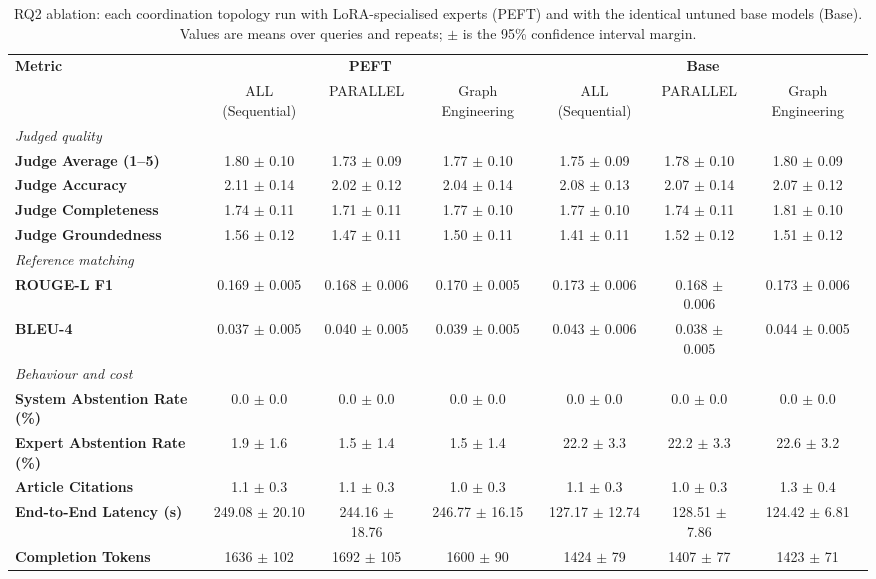 \begin{table}[t]
\centering
\caption{RQ2 ablation: each coordination topology run with LoRA-specialised experts (PEFT) and with the identical untuned base models (Base). Values are means over queries and repeats; $\pm$ is the 95\% confidence interval margin.}
\label{tab:peft_ablation}
\footnotesize
\begin{tabular}{lcccccc}
\toprule
\textbf{Metric} & \multicolumn{3}{c}{\textbf{PEFT}} & \multicolumn{3}{c}{\textbf{Base}} \\
\cmidrule(lr){2-4}\cmidrule(lr){5-7}
 & ALL (Sequential) & PARALLEL & Graph Engineering & ALL (Sequential) & PARALLEL & Graph Engineering \\
\midrule
\multicolumn{7}{l}{\textit{Judged quality}} \\
\textbf{Judge Average (1--5)} & 1.80 $\pm$ 0.10 & 1.73 $\pm$ 0.09 & 1.77 $\pm$ 0.10 & 1.75 $\pm$ 0.09 & 1.78 $\pm$ 0.10 & 1.80 $\pm$ 0.09 \\
\textbf{Judge Accuracy} & 2.11 $\pm$ 0.14 & 2.02 $\pm$ 0.12 & 2.04 $\pm$ 0.14 & 2.08 $\pm$ 0.13 & 2.07 $\pm$ 0.14 & 2.07 $\pm$ 0.12 \\
\textbf{Judge Completeness} & 1.74 $\pm$ 0.11 & 1.71 $\pm$ 0.11 & 1.77 $\pm$ 0.10 & 1.77 $\pm$ 0.10 & 1.74 $\pm$ 0.11 & 1.81 $\pm$ 0.10 \\
\textbf{Judge Groundedness} & 1.56 $\pm$ 0.12 & 1.47 $\pm$ 0.11 & 1.50 $\pm$ 0.11 & 1.41 $\pm$ 0.11 & 1.52 $\pm$ 0.12 & 1.51 $\pm$ 0.12 \\
\midrule
\multicolumn{7}{l}{\textit{Reference matching}} \\
\textbf{ROUGE-L F1} & 0.169 $\pm$ 0.005 & 0.168 $\pm$ 0.006 & 0.170 $\pm$ 0.005 & 0.173 $\pm$ 0.006 & 0.168 $\pm$ 0.006 & 0.173 $\pm$ 0.006 \\
\textbf{BLEU-4} & 0.037 $\pm$ 0.005 & 0.040 $\pm$ 0.005 & 0.039 $\pm$ 0.005 & 0.043 $\pm$ 0.006 & 0.038 $\pm$ 0.005 & 0.044 $\pm$ 0.005 \\
\midrule
\multicolumn{7}{l}{\textit{Behaviour and cost}} \\
\textbf{System Abstention Rate (\%)} & 0.0 $\pm$ 0.0 & 0.0 $\pm$ 0.0 & 0.0 $\pm$ 0.0 & 0.0 $\pm$ 0.0 & 0.0 $\pm$ 0.0 & 0.0 $\pm$ 0.0 \\
\textbf{Expert Abstention Rate (\%)} & 1.9 $\pm$ 1.6 & 1.5 $\pm$ 1.4 & 1.5 $\pm$ 1.4 & 22.2 $\pm$ 3.3 & 22.2 $\pm$ 3.3 & 22.6 $\pm$ 3.2 \\
\textbf{Article Citations} & 1.1 $\pm$ 0.3 & 1.1 $\pm$ 0.3 & 1.0 $\pm$ 0.3 & 1.1 $\pm$ 0.3 & 1.0 $\pm$ 0.3 & 1.3 $\pm$ 0.4 \\
\textbf{End-to-End Latency (s)} & 249.08 $\pm$ 20.10 & 244.16 $\pm$ 18.76 & 246.77 $\pm$ 16.15 & 127.17 $\pm$ 12.74 & 128.51 $\pm$ 7.86 & 124.42 $\pm$ 6.81 \\
\textbf{Completion Tokens} & 1636 $\pm$ 102 & 1692 $\pm$ 105 & 1600 $\pm$ 90 & 1424 $\pm$ 79 & 1407 $\pm$ 77 & 1423 $\pm$ 71 \\
\bottomrule
\end{tabular}
\end{table}